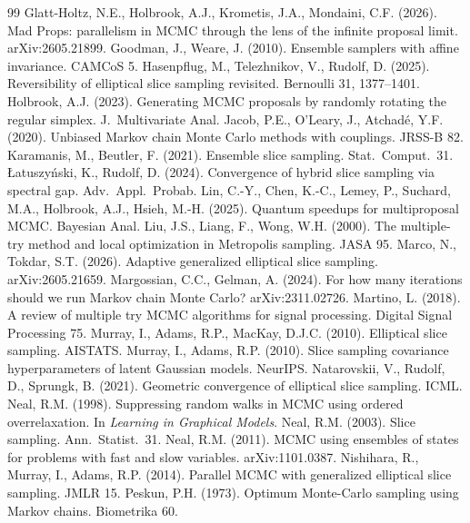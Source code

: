 \documentclass[11pt,a4paper]{article}
\theoremstyle{remark}
\begin{document}
\begin{thebibliography}{99}
 Glatt-Holtz, N.E., Holbrook, A.J., Krometis, J.A., Mondaini, C.F. (2026). Mad Props: parallelism in MCMC through the lens of the infinite proposal limit. arXiv:2605.21899.
 Goodman, J., Weare, J. (2010). Ensemble samplers with affine invariance. CAMCoS 5.
 Hasenpflug, M., Telezhnikov, V., Rudolf, D. (2025). Reversibility of elliptical slice sampling revisited. Bernoulli 31, 1377--1401.
 Holbrook, A.J. (2023). Generating MCMC proposals by randomly rotating the regular simplex. J.\ Multivariate Anal.
 Jacob, P.E., O'Leary, J., Atchad\'e, Y.F. (2020). Unbiased Markov chain Monte Carlo methods with couplings. JRSS-B 82.
 Karamanis, M., Beutler, F. (2021). Ensemble slice sampling. Stat.\ Comput.\ 31.
 {\L}atuszy\'nski, K., Rudolf, D. (2024). Convergence of hybrid slice sampling via spectral gap. Adv.\ Appl.\ Probab.
 Lin, C.-Y., Chen, K.-C., Lemey, P., Suchard, M.A., Holbrook, A.J., Hsieh, M.-H. (2025). Quantum speedups for multiproposal MCMC. Bayesian Anal.
 Liu, J.S., Liang, F., Wong, W.H. (2000). The multiple-try method and local optimization in Metropolis sampling. JASA 95.
 Marco, N., Tokdar, S.T. (2026). Adaptive generalized elliptical slice sampling. arXiv:2605.21659.
 Margossian, C.C., Gelman, A. (2024). For how many iterations should we run Markov chain Monte Carlo? arXiv:2311.02726.
 Martino, L. (2018). A review of multiple try MCMC algorithms for signal processing. Digital Signal Processing 75.
 Murray, I., Adams, R.P., MacKay, D.J.C. (2010). Elliptical slice sampling. AISTATS.
 Murray, I., Adams, R.P. (2010). Slice sampling covariance hyperparameters of latent Gaussian models. NeurIPS.
 Natarovskii, V., Rudolf, D., Sprungk, B. (2021). Geometric convergence of elliptical slice sampling. ICML.
 Neal, R.M. (1998). Suppressing random walks in MCMC using ordered overrelaxation. In \emph{Learning in Graphical Models}.
 Neal, R.M. (2003). Slice sampling. Ann.\ Statist.\ 31.
 Neal, R.M. (2011). MCMC using ensembles of states for problems with fast and slow variables. arXiv:1101.0387.
 Nishihara, R., Murray, I., Adams, R.P. (2014). Parallel MCMC with generalized elliptical slice sampling. JMLR 15.
 Peskun, P.H. (1973). Optimum Monte-Carlo sampling using Markov chains. Biometrika 60.

\end{thebibliography}
\end{document}

